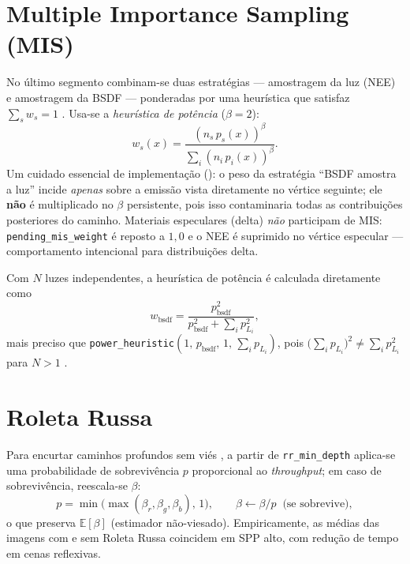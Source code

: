 \documentclass[portuguese]{sbcreviews-2025}%
\makeatletter
\newcommand{\pbrtcontentsurl}{https://pbr-book.org/4ed/contents.html}
\newcommand{\pbrtsectionurl}[1]{%
    \ifcsname pbrturl@#1\endcsname
        \csname pbrturl@#1\endcsname
    \else
        \pbrtcontentsurl
    \fi
}
\newcommand{\pbrtsec}[1]{\citep[\href{\pbrtsectionurl{#1}}{Se\c{c}\~ao~#1}]{pharr2023pbrt}}
\makeatother
\begin{document}
\section{Multiple Importance Sampling (MIS)}
\label{sec:mis}

No último segmento combinam-se duas estratégias — amostragem da luz (NEE) e amostragem da
BSDF — ponderadas por uma heurística que satisfaz $\sum_s w_s=1$ \pbrtsec{2.2.3}
\citep{veach1995optimallycombin}. Usa-se a \emph{heurística de potência} ($\beta=2$):
\begin{equation}
w_s(x) = \frac{(n_s\,p_s(x))^{\beta}}{\sum_i (n_i\,p_i(x))^{\beta}} .
\label{eq:power}
\end{equation}
Um cuidado essencial de implementação ():
o peso da estratégia ``BSDF amostra a luz'' incide \emph{apenas} sobre a emissão vista
diretamente no vértice seguinte; ele \textbf{não} é multiplicado no $\beta$ persistente, pois
isso contaminaria todas as contribuições posteriores do caminho. Materiais especulares (delta)
\emph{não} participam de MIS: \texttt{pending\_mis\_weight} é reposto a $1{,}0$ e o NEE é
suprimido no vértice especular --- comportamento intencional para distribuições delta.

Com $N$ luzes independentes, a heurística de potência é calculada diretamente como
\begin{equation}
w_\text{bsdf} = \frac{p_\text{bsdf}^2}{p_\text{bsdf}^2 + \sum_i p_{L_i}^2} ,
\label{eq:mis-multilight}
\end{equation}
mais preciso que \texttt{power\_heuristic}$(1,\,p_\text{bsdf},\,1,\,\sum_i p_{L_i})$, pois
$\bigl(\sum_i p_{L_i}\bigr)^2 \neq \sum_i p_{L_i}^2$ para $N>1$
\citep{veach1995optimallycombin}.

\section{Roleta Russa}
\label{sec:rr}

Para encurtar caminhos profundos sem viés \pbrtsec{2.2.4} \citep{misso2022unbiased}, a partir
de \texttt{rr\_min\_depth} aplica-se uma probabilidade de sobrevivência $p$ proporcional ao
\emph{throughput}; em caso de sobrevivência, reescala-se $\beta$:
\begin{equation}
p=\min\!\big(\max(\beta_r,\beta_g,\beta_b),\,1\big), \qquad
\beta \leftarrow \beta/p \;\;\text{(se sobrevive)} ,
\end{equation}
o que preserva $\mathbb{E}[\beta]$ (estimador não-viesado). Empiricamente, as médias das
imagens com e sem Roleta Russa coincidem em SPP alto, com redução de tempo em cenas reflexivas.
\end{document}

